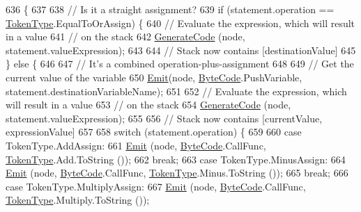 \begin{DoxyCode}
636                                                                            \{
637 
638             \textcolor{comment}{// Is it a straight assignment?}
639             \textcolor{keywordflow}{if} (statement.operation == \hyperlink{a00029_a301aa7c866593a5b625a8fc158bbeace}{TokenType}.EqualToOrAssign) \{
640                 \textcolor{comment}{// Evaluate the expression, which will result in a value}
641                 \textcolor{comment}{// on the stack}
642                 \hyperlink{a00032_a006f3becd521cc179ba3d3352f6f930b}{GenerateCode} (node, statement.valueExpression);
643 
644                 \textcolor{comment}{// Stack now contains [destinationValue]}
645             \} \textcolor{keywordflow}{else} \{
646 
647                 \textcolor{comment}{// It's a combined operation-plus-assignment}
648 
649                 \textcolor{comment}{// Get the current value of the variable}
650                 \hyperlink{a00032_a774e8c143cdda0584fcfdda98626a83c}{Emit}(node, \hyperlink{a00029_ad5dfb6ee68ca7469623ad3e459f98894}{ByteCode}.PushVariable, statement.destinationVariableName);
651 
652                 \textcolor{comment}{// Evaluate the expression, which will result in a value}
653                 \textcolor{comment}{// on the stack}
654                 \hyperlink{a00032_a006f3becd521cc179ba3d3352f6f930b}{GenerateCode} (node, statement.valueExpression);
655 
656                 \textcolor{comment}{// Stack now contains [currentValue, expressionValue]}
657 
658                 \textcolor{keywordflow}{switch} (statement.operation) \{
659 
660                 \textcolor{keywordflow}{case} TokenType.AddAssign:
661                     \hyperlink{a00032_a774e8c143cdda0584fcfdda98626a83c}{Emit} (node, \hyperlink{a00029_ad5dfb6ee68ca7469623ad3e459f98894}{ByteCode}.CallFunc, \hyperlink{a00029_a301aa7c866593a5b625a8fc158bbeace}{TokenType}.Add.ToString ());
662                     \textcolor{keywordflow}{break};
663                 \textcolor{keywordflow}{case} TokenType.MinusAssign:
664                     \hyperlink{a00032_a774e8c143cdda0584fcfdda98626a83c}{Emit} (node, \hyperlink{a00029_ad5dfb6ee68ca7469623ad3e459f98894}{ByteCode}.CallFunc, \hyperlink{a00029_a301aa7c866593a5b625a8fc158bbeace}{TokenType}.Minus.ToString ());
665                     \textcolor{keywordflow}{break};
666                 \textcolor{keywordflow}{case} TokenType.MultiplyAssign:
667                     \hyperlink{a00032_a774e8c143cdda0584fcfdda98626a83c}{Emit} (node, \hyperlink{a00029_ad5dfb6ee68ca7469623ad3e459f98894}{ByteCode}.CallFunc, \hyperlink{a00029_a301aa7c866593a5b625a8fc158bbeace}{TokenType}.Multiply.ToString ());

\end{DoxyCode}
